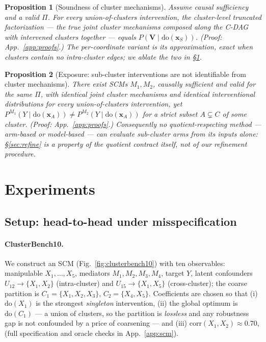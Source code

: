 \documentclass[twoside]{article}
\newtheorem{proposition}{Proposition}
\newcommand{\doo}{\mathrm{do}}
\begin{document}
\begin{proposition}[Soundness of cluster mechanisms]
\label{prop:qsound}
Assume causal sufficiency and a valid $\Pi$. For every union-of-clusters intervention, the cluster-level truncated factorization --- the true joint cluster mechanisms composed along the C-DAG with intervened clusters together --- equals $P(\mathbf{V}\mid\doo(\mathbf{x}_S))$. (Proof: App.~\ref{app:proofs}.) The per-coordinate variant is its approximation, exact when clusters contain no intra-cluster edges; we ablate the two in \S\ref{sec:exp}.
\end{proposition}

\begin{proposition}[Exposure: sub-cluster interventions are not identifiable
from cluster mechanisms]
\label{prop:qexposure}
There exist SCMs $M_1, M_2$, causally sufficient and valid for the same $\Pi$, with identical joint cluster mechanisms and identical interventional distributions for every union-of-clusters intervention, yet $P^{M_1}(Y\mid\doo(\mathbf{x}_A)) \neq P^{M_2}(Y\mid\doo(\mathbf{x}_A))$ for a strict subset $A\subsetneq C$ of some cluster. (Proof: App.~\ref{app:proofs}.) Consequently \emph{no} quotient-respecting method --- arm-based or model-based --- can evaluate sub-cluster arms from its inputs alone: \S\ref{sec:refine} is a property of the quotient contract itself, not of our refinement procedure.
\end{proposition}

\section{Experiments}
\label{sec:exp}

\subsection{Setup: head-to-head under misspecification}
\label{sec:exp-setup}
\paragraph{ClusterBench10.}
We construct an SCM (Fig.~\ref{fig:clusterbench10}) with ten observables: manipulable $X_1,\dots,X_5$, mediators $M_1,M_2,M_3,M_4$, target $Y$, latent confounders $U_{12}\!\to\!\{X_1,X_2\}$ (intra-cluster) and $U_{15}\!\to\!\{X_1,X_5\}$ (cross-cluster); the coarse partition is $C_1=\{X_1,X_2,X_3\}$, $C_2=\{X_4,X_5\}$. Coefficients are chosen so that (i) $\doo(X_1)$ is the strongest \emph{singleton} intervention, (ii) the global optimum is $\doo(C_1)$ --- a union of clusters, so the partition is \emph{lossless} and any robustness gap is not confounded by a price of coarsening --- and (iii) $\mathrm{corr}(X_1,X_2)\approx 0.70$, (full specification and oracle checks in App.~\ref{app:scm}).
\end{document}
